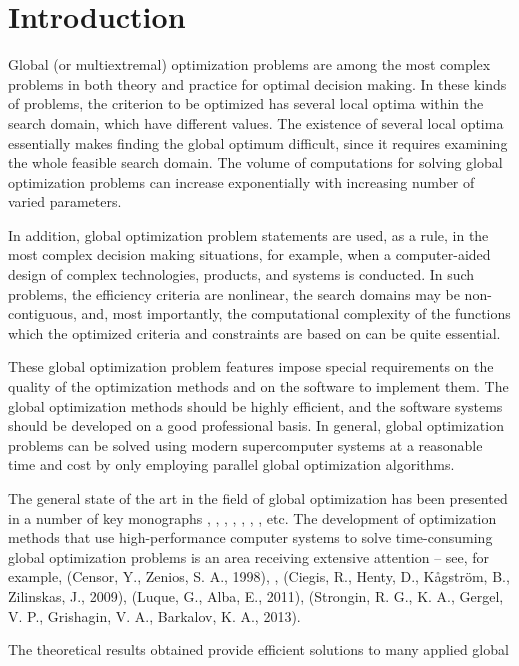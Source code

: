 \documentclass{gOMS2e}
\theoremstyle{plain}%
\theoremstyle{definition}
\theoremstyle{remark}
\begin{document}
\section{Introduction}
\label{sec:intro}
Global (or multiextremal) optimization problems are among the most complex problems
in both theory and practice for optimal decision making. In these kinds of problems,
the criterion to be optimized has several local optima within the search domain,
which have different values. The existence of several local optima essentially makes
finding the global optimum difficult, since it requires examining the whole feasible
search domain. The volume of computations for solving global optimization problems
can increase exponentially with increasing number of varied parameters.
\par
In addition, global optimization problem statements are used, as a rule, in the most
complex decision making situations, for example, when a computer-aided design of complex
technologies, products, and systems is conducted. In such problems, the efficiency
criteria are nonlinear, the search domains may be non-contiguous, and, most importantly,
the computational complexity of the functions which the optimized criteria and constraints
are based on can be quite essential.
\par
These global optimization problem features impose special requirements on the quality of
the optimization methods and on the software to implement them. The global optimization
methods should be highly efficient, and the software systems should be developed on a good
professional basis. In general, global optimization problems can be solved using modern
supercomputer systems at a reasonable time and cost by only employing parallel
global optimization algorithms.
\par
The general state of the art in the field of global optimization has been presented in a
number of key monographs \cite{zilinskTornGO}, \cite{horstTuyGO}, \cite{zhigljavskyRandGO},
\cite{pinterGO}, \cite{strSergGO}, \cite{locatelliSchoenGO}, \cite{floudasPardGO}, etc.
The development of optimization methods that use high-performance computer systems to
solve time-consuming global optimization problems is an area receiving extensive
attention – see, for example, (Censor, Y., Zenios, S. A., 1998), \cite{strSergGO}, (Ciegis, R., Henty, D., Kågström, B., Zilinskas, J., 2009), (Luque, G., Alba, E., 2011), (Strongin, R. G., K. A., Gergel, V. P., Grishagin, V. A., Barkalov, K. A.,  2013).
\par
The theoretical results obtained provide efficient solutions to many applied global
\end{document}
